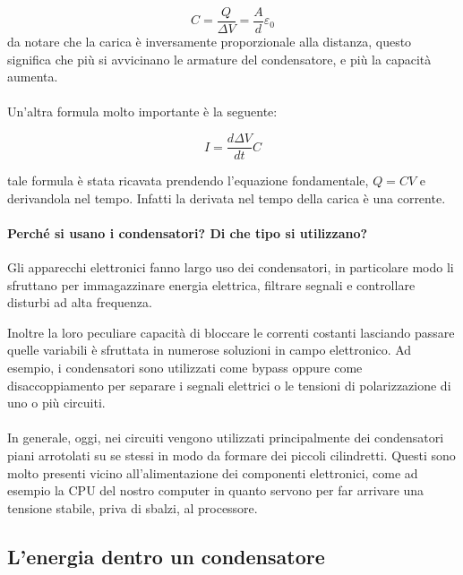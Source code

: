 \begin{equation}
    C = \frac{Q}{\Delta V} = \frac{A}{d}\varepsilon_0
\end{equation}
da notare che la carica è inversamente proporzionale alla distanza, questo significa che più si avvicinano le armature del condensatore, e più la capacità aumenta.

\paragraph{}
Un'altra formula molto importante è la seguente:

\begin{equation}
    I = \frac{d\Delta V}{dt}C
    \label{equazioneCondensatore}
\end{equation}

tale formula è stata ricavata prendendo l'equazione fondamentale, $Q = CV$ e derivandola nel tempo. Infatti la derivata nel tempo della carica è una corrente.

\paragraph{Perché si usano i condensatori? Di che tipo si utilizzano?\\}
Gli apparecchi elettronici fanno largo uso dei condensatori, in particolare modo li sfruttano per immagazzinare energia elettrica, filtrare segnali e controllare disturbi ad alta frequenza.

Inoltre la loro peculiare capacità di bloccare le correnti costanti lasciando passare quelle variabili è sfruttata in numerose soluzioni in campo elettronico. Ad esempio, i condensatori sono utilizzati come bypass oppure come disaccoppiamento per separare i segnali elettrici o le tensioni di polarizzazione di uno o più circuiti.
\paragraph{}
In generale, oggi, nei circuiti vengono utilizzati principalmente dei condensatori piani arrotolati su se stessi in modo da formare dei piccoli cilindretti. Questi sono molto presenti vicino all'alimentazione dei componenti elettronici, come ad esempio la CPU del nostro computer in quanto servono per far arrivare una tensione stabile, priva di sbalzi, al processore.

\subsection{L'energia dentro un condensatore}

